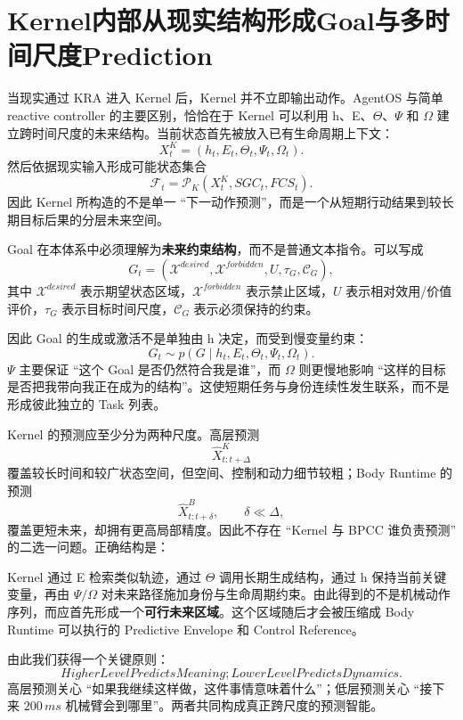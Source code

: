 \section{Kernel内部从现实结构形成Goal与多时间尺度Prediction}

当现实通过 KRA 进入 Kernel 后，Kernel 并不立即输出动作。AgentOS 与简单 reactive controller 的主要区别，恰恰在于 Kernel 可以利用 h、E、$\Theta$、$\Psi$ 和 $\Omega$ 建立跨时间尺度的未来结构。当前状态首先被放入已有生命周期上下文：
\[
X^K_t
=
\left(
h_t,
E_t,
\Theta_t,
\Psi_t,
\Omega_t
\right).
\]
然后依据现实输入形成可能状态集合
\[
\mathcal F_t
=
\mathcal P_K
\left(
X^K_t,
SGC_t,
FCS_t
\right).
\]
因此 Kernel 所构造的不是单一 ``下一动作预测''，而是一个从短期行动结果到较长期目标后果的分层未来空间。

Goal 在本体系中必须理解为\textbf{未来约束结构}，而不是普通文本指令。可以写成
\[
G_t
=
\left(
\mathcal X^{desired},
\mathcal X^{forbidden},
U,
\tau_G,
\mathcal C_G
\right),
\]
其中 $\mathcal X^{desired}$ 表示期望状态区域，$\mathcal X^{forbidden}$ 表示禁止区域，$U$ 表示相对效用/价值评价，$\tau_G$ 表示目标时间尺度，$\mathcal C_G$ 表示必须保持的约束。

因此 Goal 的生成或激活不是单独由 h 决定，而受到慢变量约束：
\[
G_t
\sim
p\left(
G\mid
h_t,E_t,\Theta_t,\Psi_t,\Omega_t
\right).
\]
$\Psi$ 主要保证 ``这个 Goal 是否仍然符合我是谁''，而 $\Omega$ 则更慢地影响 ``这样的目标是否把我带向我正在成为的结构''。这使短期任务与身份连续性发生联系，而不是形成彼此独立的 Task 列表。

Kernel 的预测应至少分为两种尺度。高层预测
\[
\hat X^K_{t:t+\Delta}
\]
覆盖较长时间和较广状态空间，但空间、控制和动力细节较粗；Body Runtime 的预测
\[
\hat X^B_{t:t+\delta},
\qquad
\delta\ll\Delta ,
\]
覆盖更短未来，却拥有更高局部精度。因此不存在 ``Kernel 与 BPCC 谁负责预测'' 的二选一问题。正确结构是：
\begin{statementbox}
\centering
{}
\end{statementbox}

Kernel 通过 E 检索类似轨迹，通过 $\Theta$ 调用长期生成结构，通过 h 保持当前关键变量，再由 $\Psi/\Omega$ 对未来路径施加身份与生命周期约束。由此得到的不是机械动作序列，而应首先形成一个\textbf{可行未来区域}。这个区域随后才会被压缩成 Body Runtime 可以执行的 Predictive Envelope 和 Control Reference。

由此我们获得一个关键原则：
\[
\boxed{
HigherLevelPredictsMeaning;
LowerLevelPredictsDynamics .
}
\]
高层预测关心 ``如果我继续这样做，这件事情意味着什么''；低层预测关心 ``接下来 $200\,ms$ 机械臂会到哪里''。两者共同构成真正跨尺度的预测智能。


